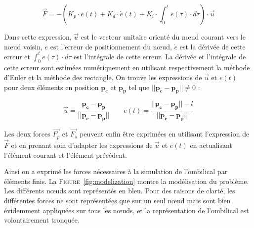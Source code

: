 \begin{description}
\begin{itemize}
						\begin{equation}
							\overrightarrow{F} = - \left(K_p \cdot e(t) + K_d \cdot \dot e(t) + K_i \cdot \int_{0}^te(\tau) \cdot d\tau \right) \cdot \overrightarrow{u}
							\label{eq:pid}
						\end{equation}
						
						Dans cette expression, $\overrightarrow{u}$ est le vecteur unitaire orienté du n\oe ud courant vers le n\oe ud voisin, $e$ est l'erreur de positionnement du n\oe ud, $\dot e$ est la dérivée de cette erreur et $\int_{0}^te(\tau) \cdot d\tau$ est l'intégrale de cette erreur. La dérivée et l'intégrale de cette erreur sont estimées numériquement en utilisant respectivement la méthode d'Euler et la méthode des rectangle. On trouve les expressions de $\overrightarrow{u}$ et $e(t)$ pour deux éléments en position $\mathbf{p_c}$ et $\mathbf{p_p}$ tel que $||\mathbf{p_c} - \mathbf{p_p}|| \neq 0$ :

						\begin{equation}
							\overrightarrow{u} = \frac{\mathbf{p_c} - \mathbf{p_p}}{||\mathbf{p_c} - \mathbf{p_p}||} \qquad e(t) = \frac{||\mathbf{p_c} - \mathbf{p_p}|| - l}{||\mathbf{p_c} - \mathbf{p_p}||}
							\label{eq:behavioral}
						\end{equation}
						
						Les deux forces $\overrightarrow{F_p}$ et $\overrightarrow{F_s}$ peuvent enfin être exprimées en utilisant l'expression de $\overrightarrow{F}$ et en prenant soin d'adapter les expressions de $\overrightarrow{u}$ et $e(t)$ en actualisant l'élément courant et l'élément précédent.
					\end{itemize}
				\end{description}
			
				Ainsi on a exprimé les forces nécessaires à la simulation de l'ombilical par éléments finis. La \textsc{Figure}~\ref{fig:modelization} montre la modélisation du problème. Les différents n\oe uds sont représentés en bleu. Pour des raisons de clarté, les différentes forces ne sont représentées que sur un seul n\oe ud mais sont bien évidemment appliquées sur tous les n\oe uds, et la représentation de l'ombilical est volontairement tronquée.
			
